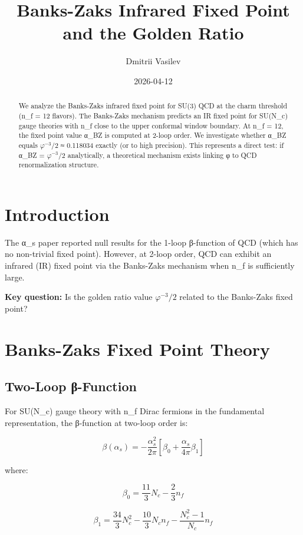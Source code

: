 \documentclass{article}
\title{Banks-Zaks Infrared Fixed Point and the Golden Ratio}
\author{Dmitrii Vasilev}
\date{2026-04-12}
\begin{document}
\maketitle

\begin{abstract}
We analyze the Banks-Zaks infrared fixed point for SU(3) QCD at the charm threshold (n_f = 12 flavors). The Banks-Zaks mechanism predicts an IR fixed point for SU(N_c) gauge theories with n_f close to the upper conformal window boundary. At n_f = 12, the fixed point value α_BZ is computed at 2-loop order. We investigate whether α_BZ equals $\varphi^{-3}/2$ ≈ 0.118034 exactly (or to high precision). This represents a direct test: if α_BZ = $\varphi^{-3}/2$ analytically, a theoretical mechanism exists linking φ to QCD renormalization structure.
\end{abstract}

\section{Introduction}

The α_s paper reported null results for the 1-loop β-function of QCD (which has no non-trivial fixed point). However, at 2-loop order, QCD can exhibit an infrared (IR) fixed point via the Banks-Zaks mechanism when n_f is sufficiently large.

\textbf{Key question:} Is the golden ratio value $\varphi^{-3}/2$ related to the Banks-Zaks fixed point?

\section{Banks-Zaks Fixed Point Theory}

\subsection{Two-Loop β-Function}

For SU(N_c) gauge theory with n_f Dirac fermions in the fundamental representation, the β-function at two-loop order is:

\[
\beta(\alpha_s) = -\frac{\alpha_s^2}{2\pi}\left[\beta_0 + \frac{\alpha_s}{4\pi}\beta_1\right]
\]

where:

\[
\beta_0 = \frac{11}{3}N_c - \frac{2}{3}n_f
\]

\[
\beta_1 = \frac{34}{3}N_c^2 - \frac{10}{3}N_c n_f - \frac{N_c^2 - 1}{N_c}n_f
\]
\end{document}
